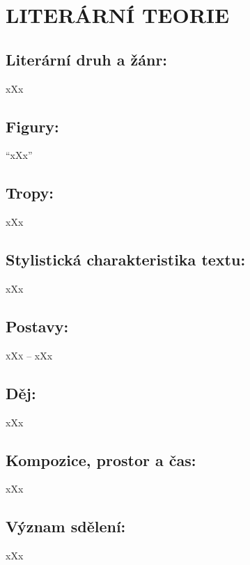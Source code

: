 \documentclass[A4paper]{extarticle} %
\begin{document}
\section*{LITERÁRNÍ TEORIE}

\subsection*{Literární druh a žánr:}
\noindent xXx



\subsection*{Figury:}
\noindent 
\enquote{xXx}

\subsection*{Tropy:}
\noindent 
xXx

\subsection*{Stylistická charakteristika textu:}
\noindent 
xXx

\subsection*{Postavy:}
\noindent 
\textsc{xXx --} xXx \\

\subsection*{Děj:}
\noindent 
xXx

\subsection*{Kompozice, prostor a čas:}
\noindent 
xXx

\subsection*{Význam sdělení:}
\noindent 
xXx
\end{document}
